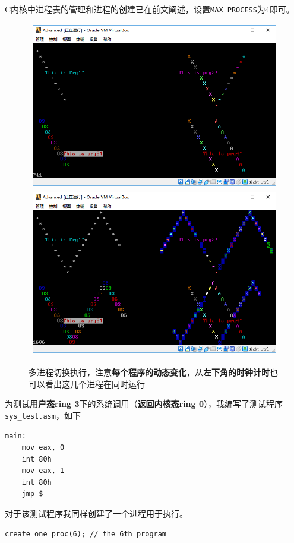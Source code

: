 \documentclass[logo,reportComp]{thesis}
\begin{document}
C内核中进程表的管理和进程的创建已在前文阐述，设置\verb'MAX_PROCESS'为4即可。
\begin{figure}[H]
\centering
\begin{tabular}{c}
\includegraphics[width=0.8\linewidth]{fig/multi-process-1.PNG}\\
\includegraphics[width=0.8\linewidth]{fig/multi-process-2.PNG}
\end{tabular}
\caption{多进程切换执行，注意\textbf{每个程序的动态变化}，从\textbf{左下角的时钟计时}也可以看出这几个进程在同时运行}
\end{figure}

为测试\textbf{用户态ring 3}下的系统调用（\textbf{返回内核态ring 0}），我编写了测试程序\verb'sys_test.asm'，如下
\begin{lstlisting}[language={[x86masm]Assembler}]
main:
	mov eax, 0
	int 80h
	mov eax, 1
	int 80h
	jmp $
\end{lstlisting}

对于该测试程序我同样创建了一个进程用于执行。
\begin{lstlisting}
create_one_proc(6); // the 6th program
\end{lstlisting}
\end{document}
